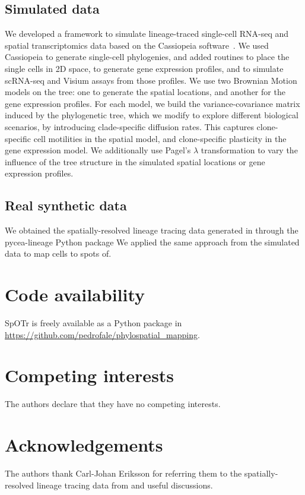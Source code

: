 \documentclass{article}
\newcommand{\toolnamex}{SpOTr }
\begin{document}
\subsection*{Simulated data}
We developed a framework to simulate lineage-traced single-cell RNA-seq and spatial transcriptomics data based on the Cassiopeia software~\cite{jones_inference_2020}. We used Cassiopeia to generate single-cell phylogenies, and added routines to place the single cells in 2D space, to generate gene expression profiles, and to simulate scRNA-seq and Visium assays from those profiles. We use two Brownian Motion models on the tree: one to generate the spatial locations, and another for the gene expression profiles. For each model, we build the variance-covariance matrix induced by the phylogenetic tree, which we modify to explore different biological scenarios, by introducing clade-specific diffusion rates. This captures clone-specific cell motilities in the spatial model, and clone-specific plasticity in the gene expression model. We additionally use Pagel's $\lambda$ transformation to vary the influence of the tree structure in the simulated spatial locations or gene expression profiles.

\subsection*{Real synthetic data}
We obtained the spatially-resolved lineage tracing data generated in \cite{koblan2025high} through the pycea-lineage Python package
We applied the same approach from the simulated data to map cells to spots of.


% 

\section*{Code availability}
\toolnamex is freely available as a Python package in \url{https://github.com/pedrofale/phylospatial_mapping}. 

\section*{Competing interests}
The authors declare that they have no competing interests.

\section*{Acknowledgements}
The authors thank Carl-Johan Eriksson for referring them to the spatially-resolved lineage tracing data from \cite{koblan2025high} and useful discussions.

  

\end{document}
